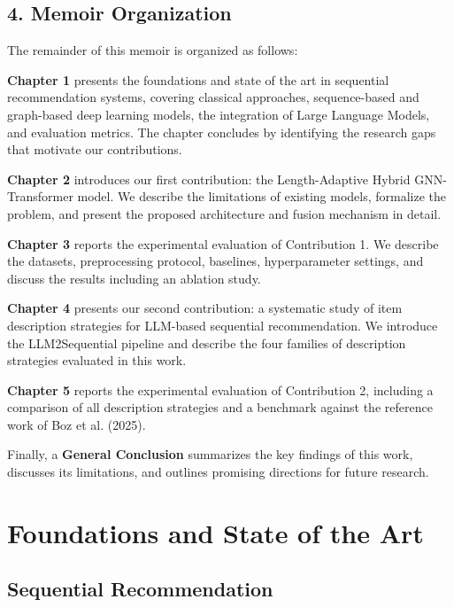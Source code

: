 \documentclass[12pt,a4paper]{report}
\begin{document}
\section*{4. Memoir Organization}

The remainder of this memoir is organized as follows:

\medskip
\textbf{Chapter 1} presents the foundations and state of the art in sequential
recommendation systems, covering classical approaches, sequence-based and
graph-based deep learning models, the integration of Large Language Models, and
evaluation metrics. The chapter concludes by identifying the research gaps that
motivate our contributions.

\textbf{Chapter 2} introduces our first contribution: the Length-Adaptive Hybrid
GNN-Transformer model. We describe the limitations of existing models, formalize
the problem, and present the proposed architecture and fusion mechanism in detail.

\textbf{Chapter 3} reports the experimental evaluation of Contribution 1. We
describe the datasets, preprocessing protocol, baselines, hyperparameter settings,
and discuss the results including an ablation study.

\textbf{Chapter 4} presents our second contribution: a systematic study of item
description strategies for LLM-based sequential recommendation. We introduce the
LLM2Sequential pipeline and describe the four families of description strategies
evaluated in this work.

\textbf{Chapter 5} reports the experimental evaluation of Contribution 2, including
a comparison of all description strategies and a benchmark against the reference
work of Boz et al. (2025).

Finally, a \textbf{General Conclusion} summarizes the key findings of this work,
discusses its limitations, and outlines promising directions for future research.


\chapter{Foundations and State of the Art}
\label{ch:state-of-the-art}

\section{Sequential Recommendation}
\end{document}
